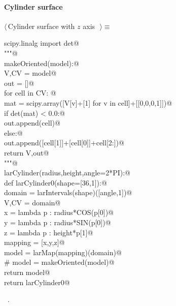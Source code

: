 \documentclass[11pt,oneside]{article}	%
\begin{document}
\paragraph{Cylinder surface}
\begin{flushleft} \small \label{scrap11}
$\langle\,$Cylinder surface with $z$ axis\nobreak\ {\footnotesize {}}$\,\rangle\equiv$
\vspace{-1ex}
\begin{list}{}{} \item
\mbox{}\verb@from scipy.linalg import det@\\
\mbox{}\verb@"""@\\
\mbox{}\verb@def makeOriented(model):@\\
\mbox{}\verb@   V,CV = model@\\
\mbox{}\verb@   out = []@\\
\mbox{}\verb@   for cell in CV: @\\
\mbox{}\verb@      mat = scipy.array([V[v]+[1] for v in cell]+[[0,0,0,1]])@\\
\mbox{}\verb@      if det(mat) < 0.0:@\\
\mbox{}\verb@         out.append(cell)@\\
\mbox{}\verb@      else:@\\
\mbox{}\verb@         out.append([cell[1]]+[cell[0]]+cell[2:])@\\
\mbox{}\verb@   return V,out@\\
\mbox{}\verb@"""@\\
\mbox{}\verb@def larCylinder(radius,height,angle=2*PI):@\\
\mbox{}\verb@   def larCylinder0(shape=[36,1]):@\\
\mbox{}\verb@      domain = larIntervals(shape)([angle,1])@\\
\mbox{}\verb@      V,CV = domain@\\
\mbox{}\verb@      x = lambda p : radius*COS(p[0])@\\
\mbox{}\verb@      y = lambda p : radius*SIN(p[0])@\\
\mbox{}\verb@      z = lambda p : height*p[1]@\\
\mbox{}\verb@      mapping = [x,y,z]@\\
\mbox{}\verb@      model = larMap(mapping)(domain)@\\
\mbox{}\verb@      # model = makeOriented(model)@\\
\mbox{}\verb@      return model@\\
\mbox{}\verb@   return larCylinder0@\\
\mbox{}\verb@@{\NWsep}
\end{list}
\vspace{-1ex}
\footnotesize\addtolength{\baselineskip}{-1ex}
\begin{list}{}{\setlength{\itemsep}{-\parsep}\setlength{\itemindent}{-\leftmargin}}
\item \NWtxtMacroRefIn\ .
\end{list}
\end{flushleft}
\end{document}
